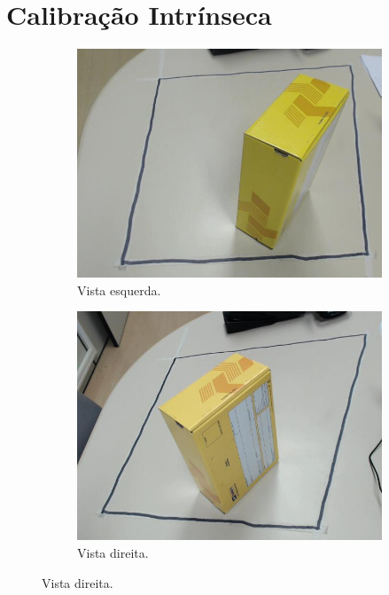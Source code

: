 
\section{Calibração Intrínseca}

\begin{figure}[H]
	\centering
	\begin{subfigure}[H]{0.49\textwidth}
		\includegraphics[width = \textwidth]{../../data/i7_L.jpg}
		\caption{Vista esquerda.}
		\label{fig:i7_L}
	\end{subfigure}
	\begin{subfigure}[H]{0.49\textwidth}
		\centering
		\includegraphics[width = \textwidth]{../../data/i7_R.jpg}
		\caption{Vista direita.}
		\label{fig:i7_R}
	\end{subfigure}
\end{figure}

